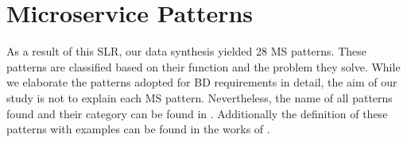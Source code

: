 \documentclass[a4paper,11pt,article,oneside]{memoir}
\begin{document}







\section{Microservice Patterns}

As a result of this SLR, our data synthesis yielded 28 MS patterns. These patterns are classified based on their function and the problem they solve. While we elaborate the patterns adopted for BD requirements in detail, the aim of our study is not to explain each MS pattern. Nevertheless, the name of all patterns found and their category can be found in \citet{MSPatterns}. Additionally the definition of these patterns with examples can be found in the works of \citet{richardson2018microservices}.
\end{document}
